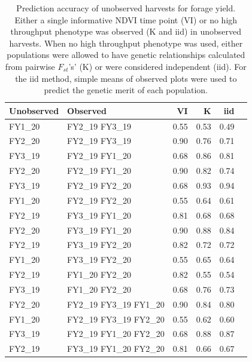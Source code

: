 \documentclass[12pt, letterpaper]{article}
\begin{document}
\begin{table}[ht]
\caption{Prediction accuracy of unobserved harvests for forage yield. Either a single informative NDVI time point (VI) or no high throughput phenotype was observed (K and iid) in unobserved harvests. When no high throughput phenotype was used, either populations were allowed to have genetic relationships calculated from pairwise $F_{st}$'s' (K) or were considered independent (iid). For the iid method, simple means of observed plots were used to predict the genetic merit of each population.}
\centering
\begin{tabular*}{\hsize}{@{\extracolsep{\fill}}llrrrr}
  \hline
 Unobserved & Observed & VI & K & iid \\ 
  \hline
  FY1\_20 & FY2\_19 FY3\_19 & 0.55 & 0.53 & 0.49 \\ 
  FY2\_20 & FY2\_19 FY3\_19 & 0.90 & 0.76 & 0.71 \\ 
  FY3\_19 & FY2\_19 FY1\_20 & 0.68 & 0.86 & 0.81 \\ 
  FY2\_20 & FY2\_19 FY1\_20 & 0.90 & 0.82 & 0.74 \\ 
  FY3\_19 & FY2\_19 FY2\_20 & 0.68 & 0.93 & 0.94 \\ 
  FY1\_20 & FY2\_19 FY2\_20 & 0.55 & 0.64 & 0.61 \\ 
  FY2\_19 & FY3\_19 FY1\_20 & 0.81 & 0.68 & 0.68 \\ 
  FY2\_20 & FY3\_19 FY1\_20 & 0.90 & 0.88 & 0.84 \\ 
  FY2\_19 & FY3\_19 FY2\_20 & 0.82 & 0.72 & 0.72 \\ 
  FY1\_20 & FY3\_19 FY2\_20 & 0.55 & 0.65 & 0.64 \\ 
  FY2\_19 & FY1\_20 FY2\_20 & 0.82 & 0.55 & 0.54 \\ 
  FY3\_19 & FY1\_20 FY2\_20 & 0.68 & 0.76 & 0.73 \\ 
  FY2\_20 & FY2\_19 FY3\_19 FY1\_20 & 0.90 & 0.84 & 0.80 \\ 
  FY1\_20 & FY2\_19 FY3\_19 FY2\_20 & 0.55 & 0.62 & 0.60 \\ 
  FY3\_19 & FY2\_19 FY1\_20 FY2\_20 & 0.68 & 0.88 & 0.87 \\ 
  FY2\_19 & FY3\_19 FY1\_20 FY2\_20 & 0.81 & 0.66 & 0.67 \\ 
   \hline
\end{tabular*}
\end{table}
\end{document}
